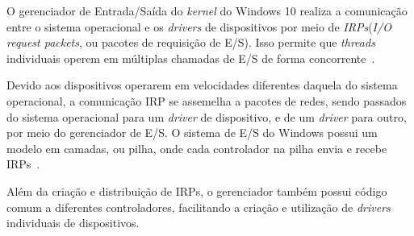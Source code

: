 O gerenciador de Entrada/Saída do \emph{kernel} do Windows 10 realiza a comunicação entre o sistema operacional e os \emph{drivers} de dispositivos por meio de \emph{IRPs}(\emph{I/O request packets}, ou pacotes de requisição de E/S). Isso permite que \emph{threads} individuais operem em múltiplas chamadas de E/S de forma concorrente~\cite{internals_pt2}.

Devido aos dispositivos operarem em velocidades diferentes daquela do sistema operacional, a comunicação IRP se assemelha a pacotes de redes, sendo passados do sistema operacional para um \emph{driver} de dispositivo, e de um \emph{driver} para outro, por meio do gerenciador de E/S. O sistema de E/S do Windows possui um modelo em camadas, ou pilha, onde cada controlador na pilha envia e recebe IRPs~\cite{w10_io_manager}.

Além da criação e distribuição de IRPs, o gerenciador também possui código comum a diferentes controladores, facilitando a criação e utilização de \emph{drivers} individuais de dispositivos.

